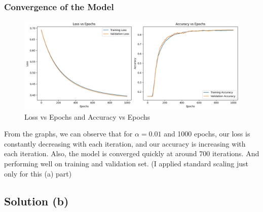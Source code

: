 \documentclass{article}
\begin{document}
\subsubsection*{Convergence of the Model}
\begin{figure}[H] %
    \centering
    \includegraphics[width=0.5\linewidth]{assets/a.png}
    \caption{Loss vs Epochs and Accuracy vs Epochs}
    \label{fig:a}
\end{figure}
\hspace{-3pt}
From the graphs, we can observe that for $\alpha = 0.01$ and 1000 epochs, our loss is constantly decreasing with each iteration, and our accuracy is increasing with each iteration. Also, the model is converged quickly at around 700 iterations. And performing well on training and validation set. (I applied standard scaling just only for this (a) part)

\vspace{20pt}
\subsection*{Solution (b)}
\end{document}
